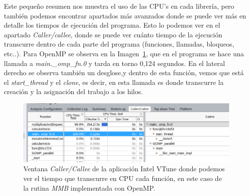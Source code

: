 \documentclass[a4paper,12pt]{article}
\begin{document}
Este pequeño resumen nos muestra el uso de las CPU's en cada librería, pero también podemos encontrar apartados más avanzados donde se puede ver más en detalle los tiempos de ejecución del programa. Esto lo podemos ver en el apartado {\it Caller/callee}, donde se puede ver cuánto tiempo de la ejecución transcurre dentro de cada parte del programa (funciones, llamadas, bloqueos, etc..). Para OpenMP se observa en la Imagen~\ref{fig:vtune-tablaomp}, que en el programa se hace una llamada a {\it main.\_omp\_fn.0} y tarda en torno 0,124 segundos. En el lateral derecho se observa también un desglose,y dentro de esta función, vemos que está el {\it start\_thread} y el {\it clone}, es decir, en esta llamada es donde transcurre la creación y la asignación del trabajo a los hilos.


\begin{figure}[htbp]
    \includegraphics[scale=0.42]{./images/vtuneompTabla.png}
    \centering
    \caption{ Ventana {\it Caller/Callee} de la aplicación Intel VTune donde podemos ver el tiempo que transcurre en CPU cada función, en este caso de la rutina {\it MMB} implementada con OpenMP.}
    \label{fig:vtune-tablaomp}
\end{figure}
\end{document}
